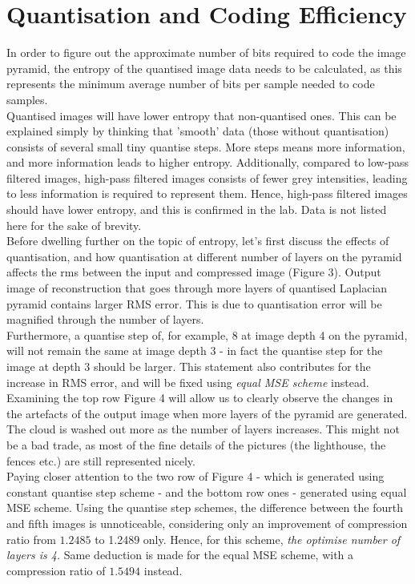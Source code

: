\documentclass[a4paper, 11pt]{article}
\begin{document}
\section{Quantisation and Coding Efficiency}
In order to figure out the approximate number of bits required to code the image pyramid, the entropy of the quantised image data needs to be calculated, as this represents the minimum average number of bits per sample needed to code samples. \\
\noindent
Quantised images will have lower entropy that non-quantised ones. This can be explained simply by thinking that 'smooth' data (those without quantisation) consists of several small tiny quantise steps. More steps means more information, and more information leads to higher entropy. Additionally, compared to low-pass filtered images, high-pass filtered images consists of fewer grey intensities, leading to less information is required to represent them. Hence, high-pass filtered images should have lower entropy, and this is confirmed in the lab. Data is not listed here for the sake of brevity. \\
\noindent
Before dwelling further on the topic of entropy, let's first discuss the effects of quantisation, and how quantisation at different number of layers on the pyramid affects the rms between the input and compressed image (Figure 3).  Output image of reconstruction that goes through more layers of quantised Laplacian pyramid contains larger RMS error. This is due to quantisation error will be magnified through the number of layers. \\
\noindent
Furthermore, a quantise step of, for example, 8 at image depth 4 on the pyramid, will not remain the same at image depth 3 - in fact the quantise step for the image at depth 3 should be larger. This statement also contributes for the increase in RMS error, and will be fixed using \textit{equal MSE scheme} instead. \\
\noindent
Examining the top row Figure 4 will allow us to clearly observe the changes in the artefacts of the output image when more layers of the pyramid are generated. The cloud is washed out more as the number of layers increases. This might not be a bad trade, as most of the fine details of the pictures (the lighthouse, the fences etc.) are still represented nicely. \\
\noindent
Paying closer attention to the two row of Figure 4 - which is generated using constant quantise step scheme - and the bottom row ones - generated using equal MSE scheme. Using the quantise step schemes, the difference between the fourth and fifth images is unnoticeable, considering only an improvement of compression ratio from $\mathbf{1.2485}$ to 1.2489 only. Hence, for this scheme, \textit{the optimise number of layers is 4.} Same deduction is made for the equal MSE scheme, with a compression ratio of $\mathbf{1.5494}$ instead. \\
\end{document}
